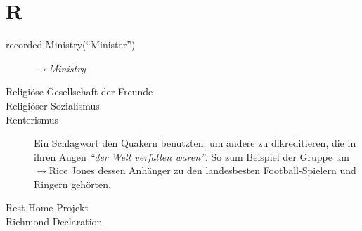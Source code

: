 \section*{R}

\articlesize

\begin{description}

 \item[recorded Ministry("`Minister"')] $\to$\textit{Ministry}

 \item[Religiöse Gesellschaft der Freunde]

  \item[Religiöser Sozialismus]

 \item[Renterismus] Ein Schlagwort den Quakern benutzten, um andere zu dikreditieren, die in ihren Augen \textit{"`der Welt verfallen waren"'}. So zum Beispiel der Gruppe um   $\to$Rice Jones dessen Anhänger zu den landesbesten Football-Spielern und Ringern gehörten.

 \item[Rest Home Projekt]

 \item[Richmond Declaration]

 \end{description}

\normalsize
